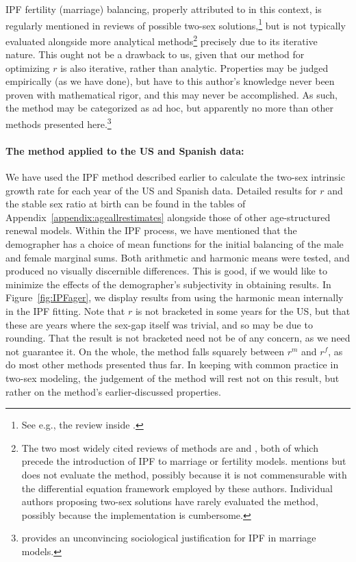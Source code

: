 IPF fertility (marriage) balancing, properly attributed to \citet{mc1975models}
in this context, is regularly mentioned in reviews of possible two-sex
solutions,\footnote{See e.g., the review inside \citet{ianelli2005gender}.} but
is not typically evaluated alongside more analytical
methods\footnote{The two most widely cited
reviews of methods are \citet{keyfitz1972mathematics} and
\citet{pollard1973mathematical}, both of which precede the introduction of IPF
to marriage or fertility models. \citet{ianelli2005gender} mentions but does not
evaluate the method, possibly because it is not commensurable with the
differential equation framework employed by these authors. Individual authors proposing
two-sex solutions have rarely evaluated the method, possibly because the implementation
is cumbersome.} precisely due to its iterative nature. This ought not be a
drawback to us, given that our method for optimizing $r$ is also iterative,
rather than analytic. Properties may be judged empirically (as we have done),
but have to this author's knowledge never been proven with mathematical rigor,
and this may never be accomplished. As such, the method may be categorized as ad
hoc, but apparently no more than other methods presented
here.\footnote{\citet{mc1975models} provides an unconvincing sociological justification for IPF in marriage
models.}

\paragraph{The method applied to the US and Spanish data:}

We have used the IPF method described earlier to calculate the two-sex intrinsic
growth rate for each year of the US and Spanish data. Detailed 
results for $r$ and the stable sex ratio at birth can be found in the tables of
Appendix~\ref{appendix:ageallrestimates} alongside those of other
age-structured renewal models. Within the IPF process, we
have mentioned that the demographer has a choice of mean functions for the
initial balancing of the male and female marginal sums. Both arithmetic and
harmonic means were tested, and produced no visually discernible differences.
This is good, if we would like to minimize the effects of the demographer's
subjectivity in obtaining results. In Figure~\ref{fig:IPFager}, we display
results from using the harmonic mean internally in the IPF fitting. Note that
$r$ is not bracketed in some years for the US, but that these are years where 
the sex-gap itself was trivial, and so may be due to
rounding. That the result is not bracketed need not be of any concern, as we
need not guarantee it. On the whole, the method falls squarely between $r^m$ and
$r^f$, as do most other methods presented thus far. In keeping with common
practice in two-sex modeling, the judgement of the method will rest not on this
result, but rather on the method's earlier-discussed properties.

